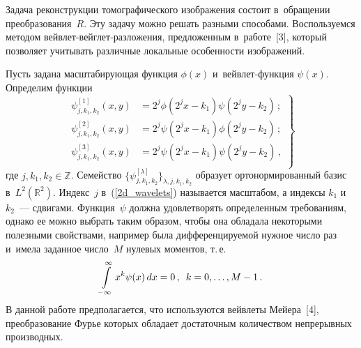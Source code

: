 \begin{multicols}{2}
Задача реконструкции томографического изоб\-ра\-же\-ния состоит в~обращении преобразования~$R$. 
Эту задачу можно решать разными способами. Воспользуемся методом 
вей\-влет-вейг\-лет-раз\-ло\-же\-ния, предложенным в~работе~[3], 
который позволяет учитывать различные локальные особенности изоб\-ра\-жений.

Пусть задана масштабирующая функция $\phi(x)$ и~вей\-в\-лет-функция $\psi(x)$. 
Определим функции
\begin{equation}
\left.
\begin{array}{rl}
\psi_{j,k_1,k_2}^{[1]} (x,y)& = 2^j \phi\left(2^j x - k_1\right) \psi\left(2^j y - k_2\right)\,;\\[6pt]
\psi_{j,k_1,k_2}^{[2]} (x,y) &= 2^j \psi\left(2^j x - k_1\right) \phi\left(2^j y - k_2\right)\,;\\[6pt]
\psi_{j,k_1,k_2}^{[3]} (x,y) &= 2^j \psi\left(2^j x - k_1\right) \psi\left(2^j y - k_2\right)\,,\\
\end{array}
\right\}
\label{2d_wavelets}
\end{equation}
где $j,k_1,k_2\in \mathbb{Z}$. Семейство 
$\{\psi^{[\lambda]}_{j,k_1,k_2}\}_{\lambda,j,k_1,k_2}$
образует ортонормированный базис в~$L^2(\mathbb{R}^2)$. Индекс~$j$ 
в~(\ref{2d_wavelets}) называется масштабом, а индексы $k_1$ и~$k_2$~---
сдвигами. Функция~$\psi$ должна удовлетворять определенным
требованиям, однако ее можно выбрать таким образом, чтобы она
обладала некоторыми полезными свойствами, например была
дифференцируемой нужное число раз и~имела заданное число~$M$
нулевых моментов, т.\,е.
$$
\int\limits_{-\infty}^{\infty}x^k\psi(x)\,dx=0\,,\enskip k=0,\ldots,M-1\,.
$$
В данной работе предполагается, что используются вейвлеты Мейера~[4], 
преобразование Фурье которых обладает достаточным количеством непрерывных 
производных.


\end{multicols}
